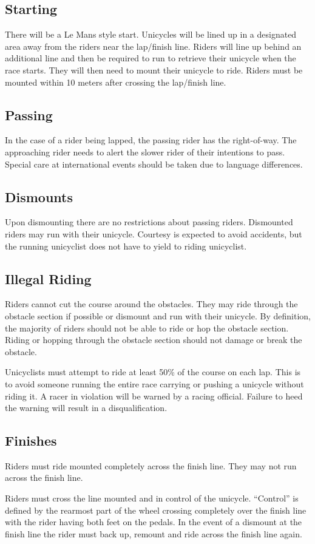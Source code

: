 \subsection{Starting}

There will be a Le Mans style start.
Unicycles will be lined up in a designated area away from the riders near the lap/finish line.
Riders will line up behind an additional line and then be required to run to retrieve their unicycle when the race starts.
They will then need to mount their unicycle to ride.
Riders must be mounted within 10 meters after crossing the lap/finish line.

\subsection{Passing}

In the case of a rider being lapped, the passing rider has the right-of-way.
The approaching rider needs to alert the slower rider of their intentions to pass.
Special care at international events should be taken due to language differences.

\subsection{Dismounts}

Upon dismounting there are no restrictions about passing riders.
Dismounted riders may run with their unicycle.
Courtesy is expected to avoid accidents, but the running unicyclist does not have to yield to riding unicyclist.

\subsection{Illegal Riding}

Riders cannot cut the course around the obstacles.
They may ride through the obstacle section if possible or dismount and run with their unicycle.
By definition, the majority of riders should not be able to ride or hop the obstacle section.
Riding or hopping through the obstacle section should not damage or break the obstacle.

Unicyclists must attempt to ride at least 50\% of the course on each lap.
This is to avoid someone running the entire race carrying or pushing a unicycle without riding it.
A racer in violation will be warned by a racing official.
Failure to heed the warning will result in a disqualification.

\subsection{Finishes}

Riders must ride mounted completely across the finish line.
They may not run across the finish line.

Riders must cross the line mounted and in control of the unicycle.
``Control'' is defined by the rearmost part of the wheel crossing completely over the finish line with the rider having both feet on the pedals.
In the event of a dismount at the finish line the rider must back up, remount and ride across the finish line again.
